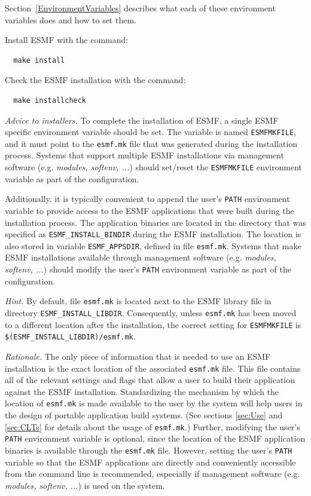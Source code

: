 Section~\ref{EnvironmentVariables} describes what each of these
environment variables does and how to set them.

Install ESMF with the command:
\begin{verbatim}
  make install
\end{verbatim}

Check the ESMF installation with the command:
\begin{verbatim}
  make installcheck
\end{verbatim}

{\em Advice to installers.} To complete the installation of ESMF, a single ESMF specific environment variable should be set. The variable is named {\tt ESMFMKFILE}, and it must point to the {\tt esmf.mk} file that was generated during the installation process. Systems that support multiple ESMF installations via management software (e.g. {\em modules, softenv, ...}) should set/reset the {\tt ESMFMKFILE} environment variable as part of the configuration.

Additionally, it is typically convenient to append the user's {\tt PATH} environment variable to provide access to the ESMF applications that were built during the installation process. The application binaries are located in the directory that was specified as {\tt ESMF\_INSTALL\_BINDIR} during the ESMF installation. The location is also stored in variable {\tt ESMF\_APPSDIR}, defined in file {\tt esmf.mk}. Systems that make ESMF installations available through management software (e.g. {\em modules, softenv, ...}) should modify the user's {\tt PATH} environment variable as part of the configuration.

{\em Hint.} By default, file {\tt esmf.mk} is located next to the ESMF library file in  directory {\tt ESMF\_INSTALL\_LIBDIR}. Consequently, unless {\tt esmf.mk} has been moved to a different location after the installation, the correct setting for {\tt ESMFMKFILE} is {\tt \$(ESMF\_INSTALL\_LIBDIR)/esmf.mk}.

{\em Rationale.} The only piece of information that is needed to use an ESMF installation is the exact location of the associated {\tt esmf.mk} file. This file contains all of the relevant settings and flags that allow a user to build their application against the ESMF installation. Standardizing the mechanism by which the location of {\tt esmf.mk} is made available to the user by the system will help users in the design of portable application build systems. (See sections \ref{sec:Use} and \ref{sec:CLTs} for details about the usage of {\tt esmf.mk}.) Further, modifying the user's {\tt PATH} environment variable is optional, since the location of the ESMF application binaries is available through the {\tt esmf.mk} file. However, setting the user's {\tt PATH} variable so that the ESMF applications are directly and conveniently accessible from the command line is recommended, especially if management software (e.g. {\em modules, softenv, ...}) is used on the system.
